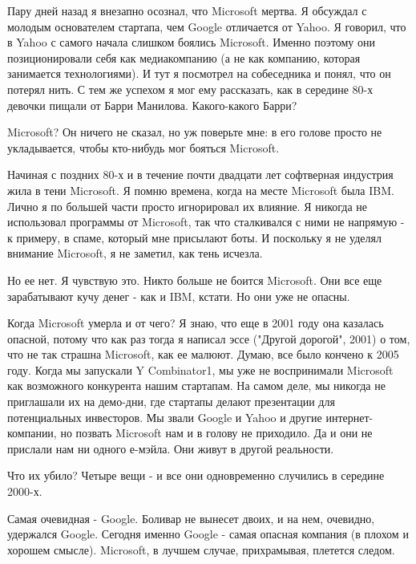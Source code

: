 \documentclass[ebook,12pt,oneside,openany]{memoir}
\begin{document}
\maketitle

Пару дней назад я внезапно осознал, что Microsoft мертва. Я обсуждал с
молодым основателем стартапа, чем Google отличается от Yahoo. Я
говорил, что в Yahoo с самого начала слишком боялись Microsoft. Именно
поэтому они позиционировали себя как медиакомпанию (а не как компанию,
которая занимается технологиями). И тут я посмотрел на собеседника и
понял, что он потерял нить. С тем же успехом я мог ему рассказать, как
в середине 80-х девочки пищали от Барри Манилова. Какого-какого Барри?

Microsoft? Он ничего не сказал, но уж поверьте мне: в его голове
просто не укладывается, чтобы кто-нибудь мог бояться Microsoft.

Начиная с поздних 80-х и в течение почти двадцати лет софтверная
индустрия жила в тени Microsoft. Я помню времена, когда на месте
Microsoft была IBM. Лично я по большей части просто игнорировал их
влияние. Я никогда не использовал программы от Microsoft, так что
сталкивался с ними не напрямую - к примеру, в спаме, который мне
присылают боты. И поскольку я не уделял внимание Microsoft, я не
заметил, как тень исчезла.

Но ее нет. Я чувствую это. Никто больше не боится Microsoft. Они все
еще зарабатывают кучу денег - как и IBM, кстати. Но они уже не опасны.

Когда Microsoft умерла и от чего? Я знаю, что еще в 2001 году она
казалась опасной, потому что как раз тогда я написал эссе ("Другой
дорогой", 2001) о том, что не так страшна Microsoft, как ее малюют.
Думаю, все было кончено к 2005 году. Когда мы запускали Y Combinator1,
мы уже не воспринимали Microsoft как возможного конкурента нашим
стартапам. На самом деле, мы никогда не приглашали их на демо-дни, где
стартапы делают презентации для потенциальных инвесторов. Мы звали
Google и Yahoo и другие интернет-компании, но позвать Microsoft нам и
в голову не приходило. Да и они не прислали нам ни одного е-мэйла. Они
живут в другой реальности.

Что их убило? Четыре вещи - и все они одновременно случились в
середине 2000-х.

Самая очевидная - Google. Боливар не вынесет двоих, и на нем,
очевидно, удержался Google. Сегодня именно Google - самая опасная
компания (в плохом и хорошем смысле). Microsoft, в лучшем случае,
прихрамывая, плетется следом.
\end{document}
